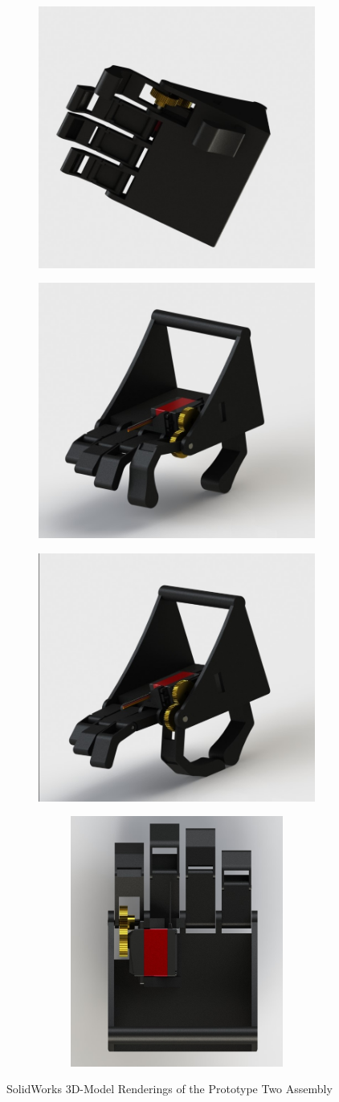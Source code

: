 \documentclass[11.5pt]{article}
\begin{document}
\begin{figure}[H]
\centering
\begin{subfigure}
  \centering
  \includegraphics[width=0.28\columnwidth]{2d/3DModelsPics/m1.jpg}
  \label{fig:sub1}
\end{subfigure}%
\begin{subfigure}
  \centering
  \includegraphics[width=0.287\columnwidth]{2d/3DModelsPics/m2.jpg}
  \label{fig:sub2}
\end{subfigure}
\begin{subfigure}
  \centering
  \includegraphics[width=0.295\columnwidth]{2d/3DModelsPics/m3.jpg}
  \begin{subfigure}
  \centering
  \includegraphics[width=0.26\columnwidth]{2d/3DModelsPics/m4.jpg}
  \label{fig:sub2}
\end{subfigure}
  \label{fig:sub2}
\end{subfigure}
\caption{SolidWorks 3D-Model Renderings of the Prototype Two Assembly}
\label{fig:aa}
\end{figure}
\end{document}
